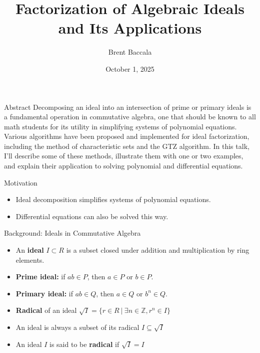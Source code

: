 \documentclass[11pt]{beamer}
\title[Factorization of Ideals]{Factorization of Algebraic Ideals and Its Applications}
\author{Brent Baccala}
\institute{\tt cosine@freesoft.org}
\date{October 1, 2025}
\begin{document}
\begin{frame}
  \titlepage
\begin{block}{Abstract}
\tiny
Decomposing an ideal into an intersection of prime or primary ideals is a fundamental operation in commutative algebra, one that should be known to all math students for its utility in simplifying systems of polynomial equations.  Various algorithms have been proposed and implemented for ideal factorization, including the method of characteristic sets and the GTZ algorithm.  In this talk, I'll describe some of these methods, illustrate them with one or two examples, and explain their application to solving polynomial and differential equations.
\end{block}

\end{frame}

\begin{frame}{Motivation}
\begin{itemize}
  \item Ideal decomposition simplifies systems of polynomial equations.
  \item Differential equations can also be solved this way.
\end{itemize}
\end{frame}

\begin{frame}{Background: Ideals in Commutative Algebra}
\begin{itemize}
  \item An \textbf{ideal} $I \subset R$ is a subset closed under addition and multiplication by ring elements.
  \item \textbf{Prime ideal:} if $ab \in P$, then $a \in P$ or $b \in P$.
  \item \textbf{Primary ideal:} if $ab \in Q$, then $a \in Q$ or $b^n \in Q$.
  \item \textbf{Radical} of an ideal $\sqrt{I} = \{ r \in R \ | \ \exists n \in \mathbb{Z}, r^n \in I\}$
  \item An ideal is always a subset of its radical $I \subseteq \sqrt{I}$
  \item An ideal $I$ is said to be \textbf{radical} if $\sqrt{I} = I$
\end{itemize}
\end{frame}
\end{document}
